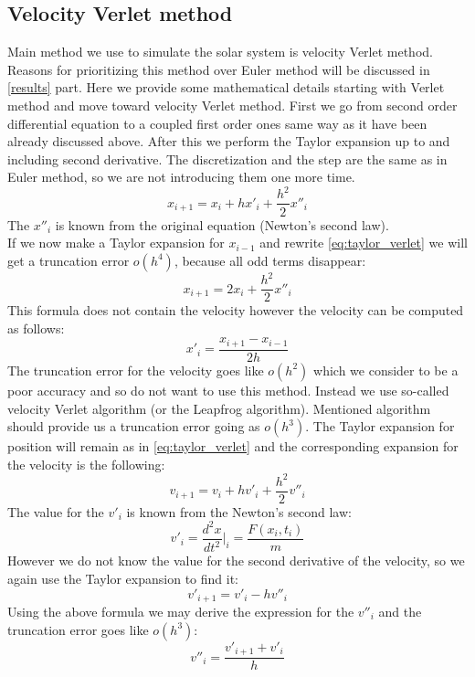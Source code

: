 \documentclass[10pt]{article}
\begin{document}
\subsection{Velocity Verlet method}
Main method we use to simulate the solar system is velocity Verlet method. Reasons for prioritizing this method over Euler method will be discussed in \ref{results} part. Here we provide some mathematical details starting with Verlet method and move toward velocity Verlet method. First we go from second order differential equation to a coupled first order ones same way as it have been already discussed above. After this we perform the Taylor expansion up to and including second derivative. The discretization and the step are the same as in Euler method, so we are not introducing them one more time.
\begin{equation}\label{eq:taylor_verlet}
x_{i+1}=x_i+hx'_i+\frac{h^2}{2}x''_i
\end{equation}
The $x''_i$ is known from the original equation (Newton's second law).\\
If we now make a Taylor expansion for $x_{i-1}$ and rewrite \ref{eq:taylor_verlet} we will get a truncation error $o(h^4)$, because all odd terms disappear: 
\[
x_{i+1}=2x_i+\frac{h^2}{2}x''_i
\]
This formula does not contain the velocity however the velocity can be computed as follows:
\[
x'_i=\frac{x_{i+1}-x_{i-1}}{2h}
\]
The truncation error for the velocity goes like $o(h^2)$ which we consider to be a poor accuracy and so do not want to use this method. Instead we use so-called velocity Verlet algorithm (or the Leapfrog algorithm). Mentioned algorithm should provide us a truncation error going as $o(h^3)$. The Taylor expansion for position will remain as in \ref{eq:taylor_verlet} and the corresponding expansion for the velocity is the following:
\begin{equation}
v_{i+1}=v_i+hv'_i+\frac{h^2}{2}v''_i
\end{equation}
The value for the $v'_i$ is known from the Newton's second law:
$$v'_i={\frac{d^2x}{dt^2}\Bigg|_i}=\frac{F(x_i,t_i)}{m}$$
However we do not know the value for the second derivative of the velocity, so we again use the Taylor expansion to find it:
\begin{equation}
v'_{i+1}=v'_i-hv''_i
\end{equation}
Using the above formula we may derive the expression for the $v''_i$ and the truncation error goes like $o(h^3)$:
\begin{equation}
v''_i=\frac{v'_{i+1}+v'_i}{h}
\end{equation}
\end{document}
